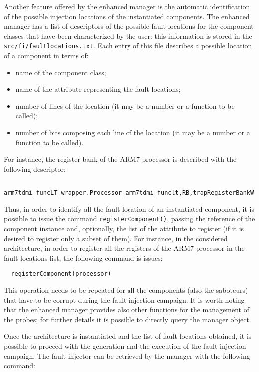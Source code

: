 \indent Another feature offered by the enhanced manager is the automatic identification of the possible injection locations of the instantiated components. The enhanced manager has a list of descriptors of the possible fault locations for the component classes that have been characterized by the user: this information is stored in the \texttt{src/fi/faultlocations.txt}. Each entry of this file describes a possible location of a component in terms of: 
\begin{itemize}
\item name of the component class;
\item name of the attribute representing the fault locations;
\item number of lines of the location (it may be a number or a function to be called);
\item number of bits composing each line of the location (it may be a number or a function to be called).
\end{itemize}
For instance, the register bank of the ARM7 processor is described with the following descriptor:

\scriptsize
\begin{verbatim}
  arm7tdmi_funcLT_wrapper.Processor_arm7tdmi_funclt,RB,trapRegisterBankWrapper,RB.__len__,32
\end{verbatim}
\normalsize

\indent Thus, in order to identify all the fault location of an instantiated component, it is possible to issue the command \texttt{registerComponent()}, passing the reference of the component instance and, optionally, the list of the attribute to register (if it is desired to register only a subset of them). For instance, in the considered architecture, in order to register all the registers of the ARM7 processor in the fault locations list, the following command is issues:

\scriptsize
\begin{verbatim}
  registerComponent(processor)
\end{verbatim}
\normalsize

\indent This operation needs to be repeated for all the components (also the saboteurs) that have to be corrupt during the fault injection campaign. It is worth noting that the enhanced manager provides also other functions for the management of the probes; for further details it is possible to directly query the manager object.

\indent Once the architecture is instantiated and the list of fault locations obtained, it is possible to proceed with the generation and the execution of the fault injection campaign. The fault injector can be retrieved by the manager with the following command:

